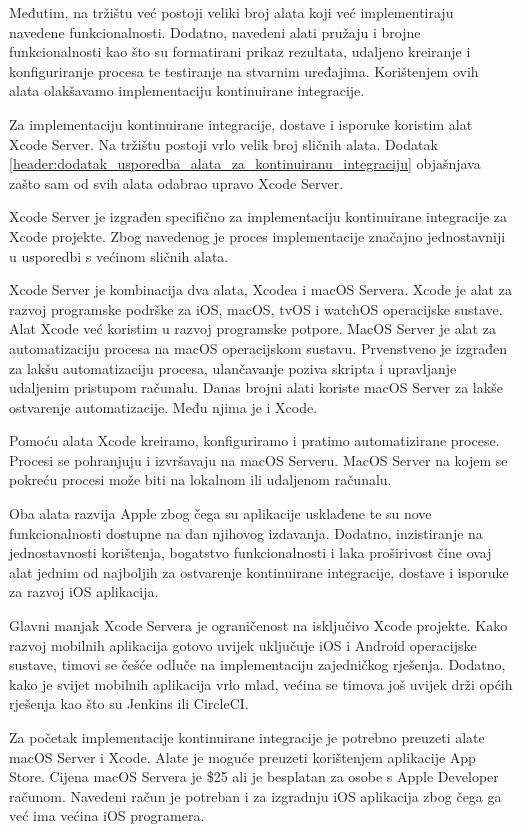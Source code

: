 \documentclass[times, utf8, diplomski, numeric]{fer}
\begin{document}
Međutim, na tržištu već postoji veliki broj alata koji već implementiraju navedene funkcionalnosti. Dodatno, navedeni alati pružaju i brojne funkcionalnosti kao što su formatirani prikaz rezultata, udaljeno kreiranje i konfiguriranje procesa te testiranje na stvarnim uređajima. Korištenjem ovih alata olakšavamo implementaciju kontinuirane integracije.

Za implementaciju kontinuirane integracije, dostave i isporuke koristim alat Xcode Server. Na tržištu postoji vrlo velik broj sličnih alata. Dodatak \ref{header:dodatak_usporedba_alata_za_kontinuiranu_integraciju} objašnjava zašto sam od svih alata odabrao upravo Xcode Server.

Xcode Server je izgrađen specifično za implementaciju kontinuirane integracije za Xcode projekte. Zbog navedenog je proces implementacije značajno jednostavniji u usporedbi s većinom sličnih alata.

Xcode Server je kombinacija dva alata, Xcodea i macOS Servera. Xcode je alat za razvoj programske podrške za iOS, macOS, tvOS i watchOS operacijske sustave. Alat Xcode već koristim u razvoj programske potpore. MacOS Server je alat za automatizaciju procesa na macOS operacijskom sustavu. Prvenstveno je izgrađen za lakšu automatizaciju procesa, ulančavanje poziva skripta i upravljanje udaljenim pristupom računalu. Danas brojni alati koriste macOS Server za lakše ostvarenje automatizacije. Među njima je i Xcode.

Pomoću alata Xcode kreiramo, konfiguriramo i pratimo automatizirane procese. Procesi se pohranjuju i izvršavaju na macOS Serveru. MacOS Server na kojem se pokreću procesi može biti na lokalnom ili udaljenom računalu.

Oba alata razvija Apple zbog čega su aplikacije usklađene te su nove funkcionalnosti dostupne na dan njihovog izdavanja. Dodatno, inzistiranje na jednostavnosti korištenja, bogatstvo funkcionalnosti i laka proširivost čine ovaj alat jednim od najboljih za ostvarenje kontinuirane integracije, dostave i isporuke za razvoj iOS aplikacija.

Glavni manjak Xcode Servera je ograničenost na isključivo Xcode projekte. Kako razvoj mobilnih aplikacija gotovo uvijek uključuje iOS i Android operacijske sustave, timovi se češće odluče na implementaciju zajedničkog rješenja. Dodatno, kako je svijet mobilnih aplikacija vrlo mlad, većina se timova još uvijek drži općih rješenja kao što su Jenkins ili CircleCI.

Za početak implementacije kontinuirane integracije je potrebno preuzeti alate macOS Server i Xcode. Alate je moguće preuzeti korištenjem aplikacije App Store. Cijena macOS Servera je \$25 ali je besplatan za osobe s Apple Developer računom. Navedeni račun je potreban i za izgradnju iOS aplikacija zbog čega ga već ima većina iOS programera.
\end{document}
